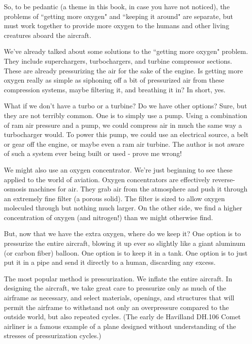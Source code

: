 So, to be pedantic (a theme in this book, in case you have not noticed), the problems of ``getting more oxygen" and ``keeping it around" are separate, but must work together to provide more oxygen to the humans and other living creatures aboard the aircraft.

We've already talked about some solutions to the ``getting more oxygen" problem. They include superchargers, turbochargers, and turbine compressor sections. These are already pressurizing the air for the sake of the engine. Is getting more oxygen really as simple as siphoning off a bit of pressurized air from these compression systems, maybe filtering it, and breathing it in? In short, yes.

What if we don't have a turbo or a turbine? Do we have other options? Sure, but they are not terribly common. One is to simply use a pump. Using a combination of ram air pressure and a pump, we could compress air in much the same way a turbocharger would. To power this pump, we could use an electrical source, a belt or gear off the engine, or maybe even a ram air turbine. The author is not aware of such a system ever being built or used - prove me wrong!

We might also use an oxygen concentrator. We're just beginning to see these applied to the world of aviation. Oxygen concentrators are effectively reverse-osmosis machines for air. They grab air from the atmosphere and push it through an extremely fine filter (a porous solid). The filter is sized to allow oxygen moleculed through but nothing much larger. On the other side, we find a higher concentration of oxygen (and nitrogen!) than we might otherwise find.

But, now that we have the extra oxygen, where do we keep it? One option is to pressurize the entire aircraft, blowing it up ever so slightly like a giant aluminum (or carbon fiber) balloon. One option is to keep it in a tank. One option is to just put it in a pipe and send it directly to a human, discarding any excess.

The most popular method is pressurization. We inflate the entire aircraft. In designing the aircraft, we take great care to pressurize only as much of the airframe as necessary, and select materials, openings, and structures that will permit the airframe to withstand not only an overpressure compared to the outside world, but also repeated cycles. (The early de Havilland DH.106 Comet airliner is a famous example of a plane designed without understanding of the stresses of pressurization cycles.)

